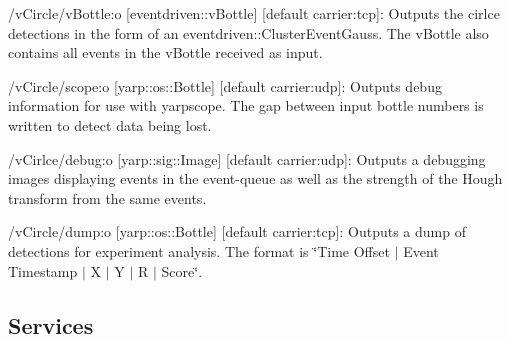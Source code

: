 \begin{DoxyItemize}
\item /v\+Circle/v\+Bottle\+:o \mbox{[}eventdriven\+::v\+Bottle\mbox{]} \mbox{[}default carrier\+:tcp\mbox{]}\+: Outputs the cirlce detections in the form of an eventdriven\+::\+Cluster\+Event\+Gauss. The v\+Bottle also contains all events in the v\+Bottle received as input.
\item /v\+Circle/scope\+:o \mbox{[}yarp\+::os\+::\+Bottle\mbox{]} \mbox{[}default carrier\+:udp\mbox{]}\+: Outputs debug information for use with yarpscope. The gap between input bottle numbers is written to detect data being lost.
\item /v\+Cirlce/debug\+:o \mbox{[}yarp\+::sig\+::\+Image\mbox{]} \mbox{[}default carrier\+:udp\mbox{]}\+: Outputs a debugging images displaying events in the event-\/queue as well as the strength of the Hough transform from the same events.
\item /v\+Circle/dump\+:o \mbox{[}yarp\+::os\+::\+Bottle\mbox{]} \mbox{[}default carrier\+:tcp\mbox{]}\+: Outputs a dump of detections for experiment analysis. The format is \char`\"{}\+Time Offset $\vert$ Event Timestamp $\vert$ X $\vert$ Y $\vert$ R $\vert$ Score\char`\"{}.
\end{DoxyItemize}\hypertarget{group__zynqGrabber_services_sec}{}\subsection{Services}\label{group__zynqGrabber_services_sec}

